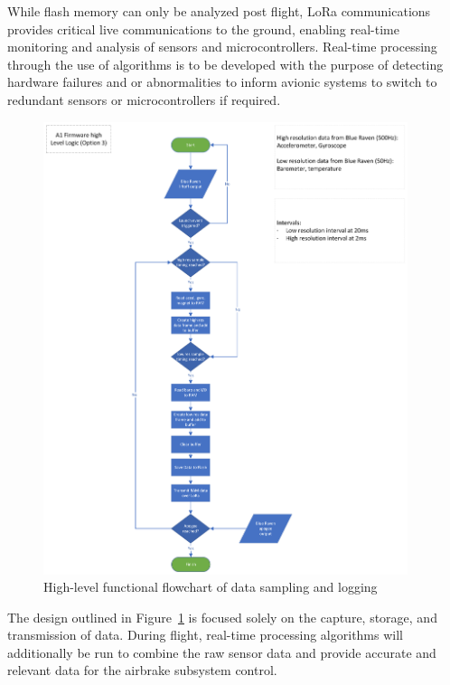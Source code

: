While flash memory can only be analyzed post flight, LoRa communications provides critical live communications to the ground, enabling real-time monitoring and analysis of sensors and microcontrollers. Real-time processing through the use of algorithms is to be developed with the purpose of detecting hardware failures and or abnormalities to inform avionic systems to switch to redundant sensors or microcontrollers if required.  

\begin{figure}[h]
  \begin{center}
    \includegraphics[width=0.95\textwidth]{img/flowchart-high_level.png}
  \end{center}
  \caption{High-level functional flowchart of data sampling and logging}\label{fig:flowchart-high_level}
\end{figure}

The design outlined in Figure~\ref{fig:flowchart-high_level} is focused solely on the capture, storage, and transmission of data. During flight, real-time processing algorithms will additionally be run to combine the raw sensor data and provide accurate and relevant data for the airbrake subsystem control.

